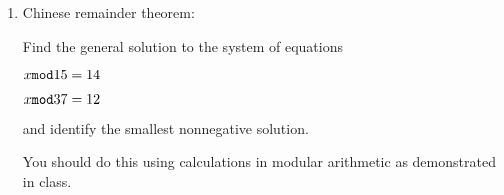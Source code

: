 \documentclass[12pt]{article}
\begin{document}
\begin{enumerate}
\newpage

\item  Chinese remainder theorem:

Find the general solution to the system of equations

$x {\tt mod} 15 = 14$

$x {\tt mod} 37 = 12$

and identify the smallest nonnegative solution.

You should do this using calculations in modular arithmetic as demonstrated in class.

\newpage

\end{enumerate}
\end{document}
